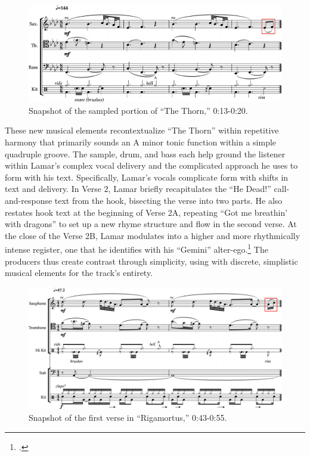     \begin{figure}[ht]
        \centering
        \includegraphics[width=\textwidth]{images/figures/chp 02/013020thethornfull.pdf}
        \caption{Snapshot of the sampled portion of ``The Thorn,'' 0:13-0:20.}
        \label{fig:thethornfull}
    \end{figure}

These new musical elements recontextualize ``The Thorn'' within repetitive harmony that primarily sounds an A minor tonic function within a simple quadruple groove. The sample, drum, and bass each help ground the listener within Lamar's complex vocal delivery and the  complicated approach he uses to form with his text. Specifically, Lamar's vocals complicate form with shifts in text and delivery. In Verse 2, Lamar briefly recapitulates the ``He Dead!'' call-and-response text from the hook, bisecting the verse into two parts. He also restates hook text at the beginning of Verse 2A, repeating ``Got me breathin' with dragons'' to set up a new rhyme structure and flow in the second verse. At the close of the Verse 2B, Lamar modulates into a higher and more rhythmically intense register, one that he identifies with his ``Gemini'' alter-ego.\footnote{\cite{chrismenchTrackingManyVoices2017}.} The producers thus create contrast through simplicity, using with discrete, simplistic musical elements for the track's entirety.

\begin{figure}[ht]
    \centering
    \includegraphics[width=\textwidth]{images/figures/chp 02/043053rigamortusnoslip.pdf}
    \caption{Snapshot of the first verse in ``Rigamortus,'' 0:43-0:55.}
    \label{fig:rigamortusnoslip}
\end{figure}


